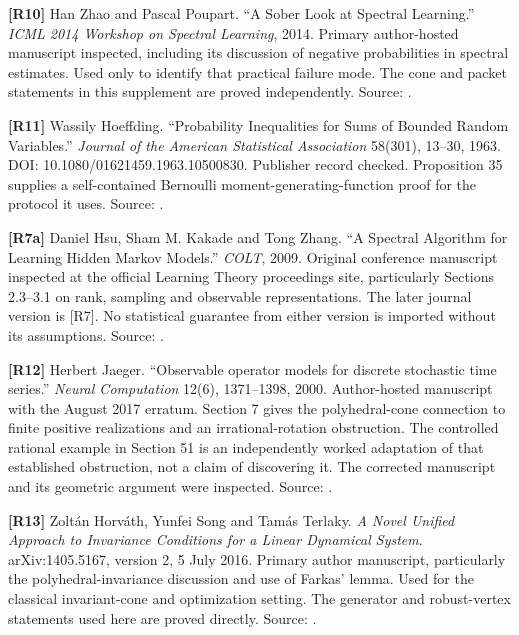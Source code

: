 \documentclass[11pt,letterpaper]{article}
\begin{document}
\textbf{{[}R10{]}} Han Zhao and Pascal Poupart. ``A Sober Look at
Spectral Learning.'' \emph{ICML 2014 Workshop on Spectral Learning},
2014. Primary author-hosted manuscript inspected, including its
discussion of negative probabilities in spectral estimates. Used only to
identify that practical failure mode. The cone and packet statements in
this supplement are proved independently. Source:
.

\textbf{{[}R11{]}} Wassily Hoeffding. ``Probability Inequalities for
Sums of Bounded Random Variables.'' \emph{Journal of the American
Statistical Association} 58(301), 13--30, 1963. DOI:
10.1080/01621459.1963.10500830. Publisher record checked. Proposition 35
supplies a self-contained Bernoulli moment-generating-function proof for
the protocol it uses. Source:
.

\textbf{{[}R7a{]}} Daniel Hsu, Sham M. Kakade and Tong Zhang. ``A
Spectral Algorithm for Learning Hidden Markov Models.'' \emph{COLT},
2009. Original conference manuscript inspected at the official Learning
Theory proceedings site, particularly Sections 2.3--3.1 on rank,
sampling and observable representations. The later journal version is
{[}R7{]}. No statistical guarantee from either version is imported
without its assumptions. Source:
.

\textbf{{[}R12{]}} Herbert Jaeger. ``Observable operator models for
discrete stochastic time series.'' \emph{Neural Computation} 12(6),
1371--1398, 2000. Author-hosted manuscript with the August 2017 erratum.
Section 7 gives the polyhedral-cone connection to finite positive
realizations and an irrational-rotation obstruction. The controlled
rational example in Section 51 is an independently worked adaptation of
that established obstruction, not a claim of discovering it. The
corrected manuscript and its geometric argument were inspected. Source:
.

\textbf{{[}R13{]}} Zoltán Horváth, Yunfei Song and Tamás Terlaky.
\emph{A Novel Unified Approach to Invariance Conditions for a Linear
Dynamical System}. arXiv:1405.5167, version 2, 5 July 2016. Primary
author manuscript, particularly the polyhedral-invariance discussion and
use of Farkas' lemma. Used for the classical invariant-cone and
optimization setting. The generator and robust-vertex statements used
here are proved directly. Source:
.
\end{document}
